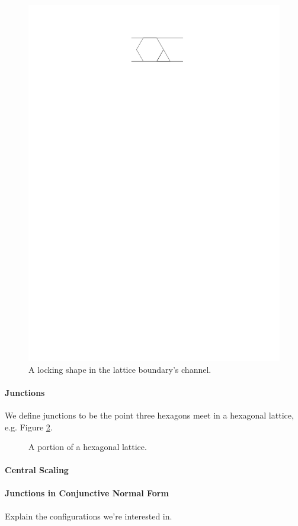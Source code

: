 \begin{figure}[h]
\begin{center}
\includegraphics{../graphics/shapeInChannel.pdf}
\end{center} 
\caption{A locking shape in the lattice boundary's channel.}
\label{fig:lockingShapeInChannel}
\end{figure}
\paragraph{Junctions}
We define junctions to be the point three hexagons meet in a hexagonal lattice,
e.g. Figure \ref{fig:lattice}.
\newdimen\R
\R=4.5cm
\begin{figure}[h] 
\begin{center}
\caption{A portion of a hexagonal lattice.}
\label{fig:lattice}
\end{center}
\end{figure}
\newpage
\paragraph{Central Scaling}
\paragraph{Junctions in Conjunctive Normal Form}
Explain the configurations we're interested in.
